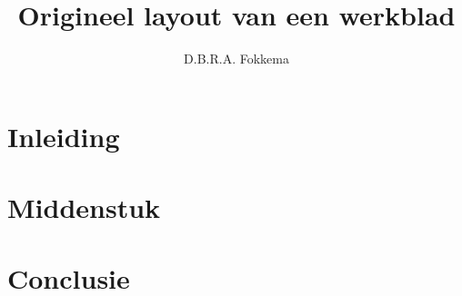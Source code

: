 

\usepackage{lipsum}

\title{Origineel layout van een werkblad}
\author{D.B.R.A. Fokkema}



\maketitle

\section{Inleiding}

\lipsum[1-14]

\section{Middenstuk}

\section{Conclusie}


